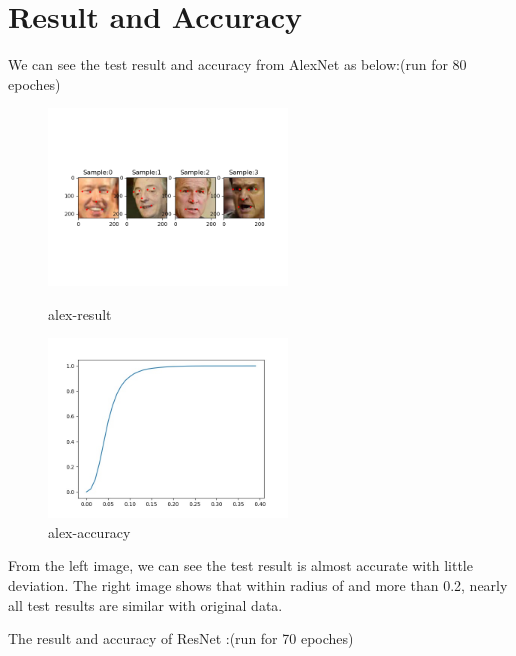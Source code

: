 \documentclass{article}
\begin{document}
\newpage
\section{Result and Accuracy}

We can see the test result and accuracy from AlexNet as below:(run for 80 epoches)

\begin{figure}[h]
	\begin{minipage}[t]{0.5\linewidth}
		\centering
		\includegraphics[width=2.5in]{alexresult.png}
		\caption{alex-result}
		\label{fig:side:a}
	\end{minipage}%
	\begin{minipage}[t]{0.5\linewidth}
		\centering
		\includegraphics[width=2.5in]{alexradius.jpg}
		\caption{alex-accuracy}
		\label{fig:side:b}
	\end{minipage}
\end{figure}
 
 From the left image, we can see the test result is almost accurate with little deviation. The right image shows that within radius of and more than 0.2, nearly all test results are similar with original data.
 
The result and accuracy of ResNet :(run for 70 epoches)
\end{document}
